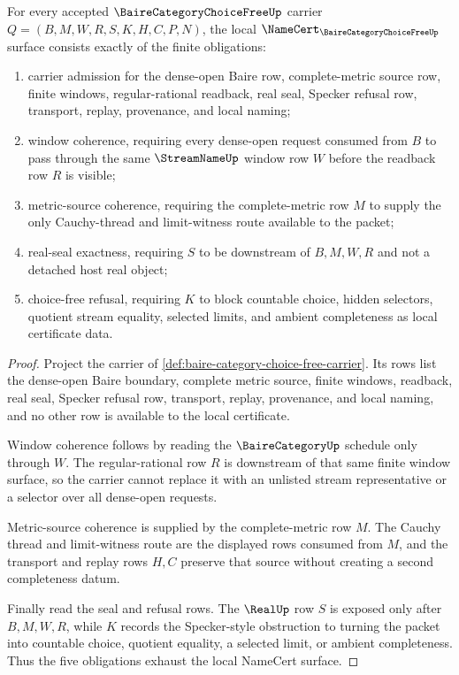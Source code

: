 \begin{theorem}
\label{thm:baire-category-choice-free-namecert-obligations}
For every accepted $\BaireCategoryChoiceFreeUp$ carrier $Q=(B,M,W,R,S,K,H,C,P,N)$, the local $\NameCert_{\BaireCategoryChoiceFreeUp}$ surface consists exactly of the finite obligations:
\begin{enumerate}
\item carrier admission for the dense-open Baire row, complete-metric source row, finite windows, regular-rational readback, real seal, Specker refusal row, transport, replay, provenance, and local naming;
\item window coherence, requiring every dense-open request consumed from $B$ to pass through the same $\StreamNameUp$ window row $W$ before the readback row $R$ is visible;
\item metric-source coherence, requiring the complete-metric row $M$ to supply the only Cauchy-thread and limit-witness route available to the packet;
\item real-seal exactness, requiring $S$ to be downstream of $B,M,W,R$ and not a detached host real object;
\item choice-free refusal, requiring $K$ to block countable choice, hidden selectors, quotient stream equality, selected limits, and ambient completeness as local certificate data.
\end{enumerate}
\end{theorem}
\begin{proof}
Project the carrier of \autoref{def:baire-category-choice-free-carrier}. Its rows list the dense-open Baire boundary, complete metric source, finite windows, readback, real seal, Specker refusal row, transport, replay, provenance, and local naming, and no other row is available to the local certificate.

Window coherence follows by reading the $\BaireCategoryUp$ schedule only through $W$. The regular-rational row $R$ is downstream of that same finite window surface, so the carrier cannot replace it with an unlisted stream representative or a selector over all dense-open requests.

Metric-source coherence is supplied by the complete-metric row $M$. The Cauchy thread and limit-witness route are the displayed rows consumed from $M$, and the transport and replay rows $H,C$ preserve that source without creating a second completeness datum.

Finally read the seal and refusal rows. The $\RealUp$ row $S$ is exposed only after $B,M,W,R$, while $K$ records the Specker-style obstruction to turning the packet into countable choice, quotient equality, a selected limit, or ambient completeness. Thus the five obligations exhaust the local NameCert surface.
\end{proof}

